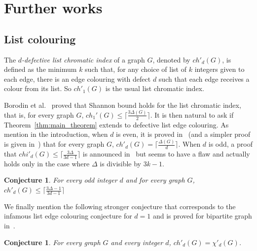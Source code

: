 \documentclass[11pt]{article}
\newtheorem{conjecture}[lemma]{Conjecture}
\begin{document}
\section{Further works}\label{sec:further}

\subsection*{List colouring}
The \textit{$d$-defective list chromatic index} of a graph $G$, denoted by $ch'_d(G)$, is defined as the minimum $k$ such that, for any choice of list of $k$ integers given to each edge, there is an edge colouring with defect $d$ such that each edge receives a colour from its list.  So $ch'_1(G)$ is the usual list chromatic index. 

Borodin et al.~\cite{10.1006/jctb.1997.1780} proved that Shannon bound holds for the list chromatic index, that is, for every graph $G$, 
$ch_1'(G) \leq \lceil \frac{3 \Delta(G)}{2} \rceil$. It is then natural to ask if Theorem~\ref{thm:main_theorem} extends to defective list edge colouring. 
As mention in the introduction, when $d$ is even, it is proved in~\cite{HILTON2001253} (and a simpler proof is given in~\cite{amini:inria-00144318}) that for every graph $G$,  $ch'_d(G) = \lceil \frac{\Delta(G)}{d} \rceil$. 
When $d$ is odd, a proof that $chi'_{d}(G) \leq \lceil \frac{3\Delta}{3d - 1} \rceil$ is announced in~\cite{amini:inria-00144318} but seems to have a flaw and actually holds only in the case where $\Delta$ is divisible by $3k-1$. 

\begin{conjecture}
For every odd integer $d$ and for every  graph $G$, $ch'_d(G) \leq  \lceil \frac{3\Delta - 1}{3d-1} \rceil$
\end{conjecture}


We finally mention the following stronger conjecture that corresponds to the infamous list edge colouring conjecture for $d=1$ and is proved for bipartite graph in~\cite{HILTON2001253}. 

\begin{conjecture}\cite{HSS98}
For every graph $G$ and every integer $d$, $ch'_d(G) = \chi'_d(G)$.
\end{conjecture}
\end{document}
